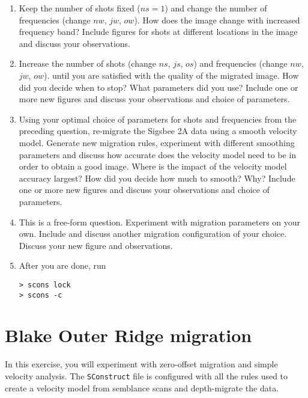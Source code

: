 \begin{enumerate}

\item
Keep the number of shots fixed ($ns=1$) 
and change the number of frequencies 
(change $nw$, $jw$, $ow$).
How does the image change with increased frequency band?
Include figures for shots at different locations in the 
image and discuss your observations.


\item
Increase the number of shots 
(change $ns$, $js$, $os$)
and frequencies 
(change $nw$, $jw$, $ow$).
until you are satisfied with the quality of the migrated image.
How did you decide when to stop?
What parameters did you use?
Include one or more new figures and discuss your 
observations and choice of parameters.


\item
Using your optimal choice of parameters for shots
and frequencies from the preceding question, 
re-migrate the Sigsbee 2A data using a smooth velocity model.
Generate new migration rules,
experiment with different smoothing parameters and 
discuss how accurate does the velocity model need to be
in order to obtain a good image.
Where is the impact of the velocity model accuracy largest?
How did you decide how much to smooth? Why?
Include one or more new figures and discuss your 
observations and choice of parameters.



\item
This is a free-form question.
Experiment with migration parameters on your own.
Include and discuss another migration configuration
of your choice. Discuss your new figure and observations.


\item After you are done, run

\begin{verbatim}
> scons lock
> scons -c
\end{verbatim} 
  
\end{enumerate}


\section{Blake Outer Ridge migration}
In this exercise, you will experiment with zero-offset 
migration and simple velocity analysis.
The \texttt{SConstruct} file is configured with all the rules
used to create a velocity model from semblance scans and
depth-migrate the data.


